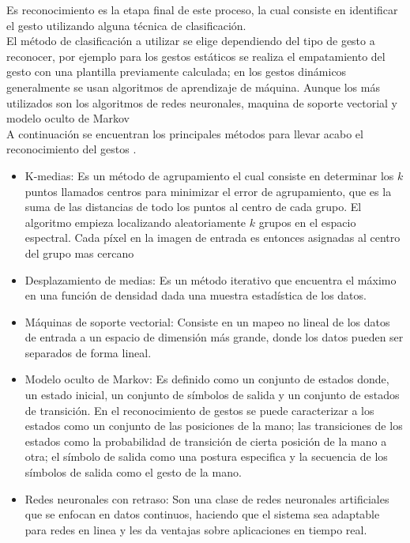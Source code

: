Es reconocimiento es la etapa final de este proceso, la cual consiste en identificar el gesto utilizando alguna técnica de clasificación.\\
El método de clasificación a utilizar se elige dependiendo del tipo de gesto a reconocer, por ejemplo para los gestos estáticos se realiza el empatamiento del gesto con una plantilla previamente calculada; en los gestos dinámicos generalmente  se usan algoritmos de aprendizaje de máquina. Aunque los más utilizados son los algoritmos de redes neuronales, maquina de soporte vectorial y modelo oculto de Markov\\ 
A continuación se encuentran los principales métodos para llevar acabo el reconocimiento del gestos \citep{Rautaray2012}. 
\begin{itemize}
	\item K-medias: Es un método de agrupamiento el cual consiste en determinar los $k$ puntos llamados centros para minimizar el error de agrupamiento, que es la suma de las distancias de todo los puntos al centro de cada grupo. El algoritmo empieza localizando aleatoriamente $k$ grupos en el espacio espectral. Cada p\'ixel en la imagen de entrada es entonces asignadas al centro del grupo mas cercano  
	\item Desplazamiento de medias: Es un método iterativo que encuentra el máximo en una función de densidad dada una muestra estadística de los datos.
	\item Máquinas de soporte vectorial: Consiste en un mapeo no lineal de los datos de entrada a un espacio de dimensi\'on m\'as grande, donde los datos pueden ser separados de forma lineal.  
	\item Modelo oculto de Markov: Es definido como un conjunto de estados donde, un estado inicial, un conjunto de símbolos de salida y un conjunto de estados de transición. En el reconocimiento de gestos se puede caracterizar a    los estados como un conjunto de las posiciones de la mano; las  transiciones de los estados como la probabilidad de transición de cierta posición de la mano a otra; el símbolo de salida como una postura especifica y la secuencia de los símbolos de salida como  el gesto de la mano.   
	\item Redes neuronales con retraso: Son una clase de redes neuronales artificiales que se enfocan en datos continuos, haciendo que el sistema sea adaptable para redes en linea y les da ventajas sobre aplicaciones en tiempo real. 
\end{itemize}  


